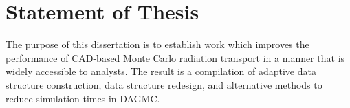 \section{Statement of Thesis}

The purpose of this dissertation is to establish work which improves the
performance of CAD-based Monte Carlo radiation transport in a manner that is
widely accessible to analysts. The result is a compilation of adaptive data
structure construction, data structure redesign, and alternative methods to
reduce simulation times in DAGMC.
